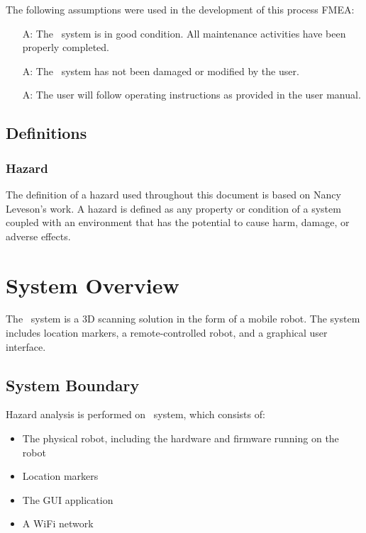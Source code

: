 \documentclass[12pt]{article}
\newcounter{assumpnum} %
\begin{document}
The following assumptions were used in the development of this process FMEA:

\noindent \begin{itemize}
\item[A\refstepcounter{assumpnum}\theassumpnum \label{Assumption1}:] The \progname ~system is in good condition. All maintenance activities have been properly completed. 

\item[A\refstepcounter{assumpnum}\theassumpnum \label{Assumption2}:]The \progname ~system has not been damaged or modified by the user.

\item[A\refstepcounter{assumpnum}\theassumpnum \label{Assumption4}:] The user will follow operating instructions as provided in the user manual.

\end{itemize}

\subsection{Definitions}

\subsubsection{Hazard}

The definition of a hazard used throughout this document is based on  Nancy Leveson's work. A hazard is defined as any property or condition of a system coupled with an environment that has the potential to cause harm, damage, or adverse effects.

\section{System Overview}

The \progname ~system is a 3D scanning solution in the form of a mobile robot. The system includes location markers, a remote-controlled robot, and a graphical user interface.

\subsection{System Boundary}

Hazard analysis is performed on \progname ~system, which consists of: 

\begin{itemize}
\item The physical robot, including the hardware and firmware running on the robot
\item Location markers
\item The GUI application
\item A WiFi network
\end{itemize}
\end{document}
